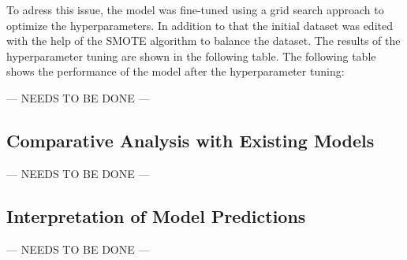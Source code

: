 To adress this issue, the model was fine-tuned using a grid search approach to optimize the hyperparameters. In addition to that the initial dataset was edited with the help of the SMOTE algorithm to balance the dataset. The results of the hyperparameter tuning are shown in the following table. \autocite{chawlaSMOTESyntheticMinority2002}
The following table shows the performance of the model after the hyperparameter tuning:

--- NEEDS TO BE DONE ---

\subsection{Comparative Analysis with Existing Models}
\label{sec:Comparative Analysis with Existing Models}

--- NEEDS TO BE DONE ---

\subsection{Interpretation of Model Predictions}
\label{sec:Interpretation of Model Predictions}

--- NEEDS TO BE DONE ---